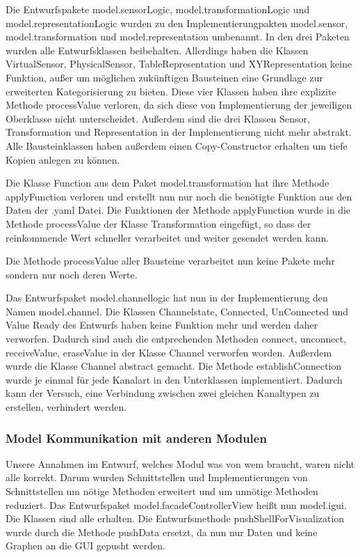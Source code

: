 \documentclass[parskip=full]{scrartcl}
\begin{document}
Die Entwurfspakete model.sensorLogic, model.transformationLogic und model.representationLogic wurden zu den Implementierungpakten model.sensor, model.transformation und model.representation umbenannt. In den drei Paketen wurden alle Entwurfsklassen beibehalten. Allerdings haben die Klassen VirtualSensor, PhysicalSensor, TableRepresentation und XYRepresentation keine Funktion, außer um möglichen zukünftigen Bausteinen eine Grundlage zur erweiterten Kategorisierung zu bieten. Diese vier Klassen haben ihre explizite Methode processValue verloren, da sich diese von Implementierung der jeweiligen Oberklasse nicht unterscheidet. Außerdem sind die drei Klassen Sensor, Transformation und Representation in der Implementierung nicht mehr abstrakt. Alle Bausteinklassen haben außerdem einen Copy-Constructor erhalten um tiefe Kopien anlegen zu können.

Die Klasse Function aus dem Paket model.transformation hat ihre Methode applyFunction verloren und erstellt nun nur noch die benötigte Funktion aus den Daten der .yaml Datei. Die Funktionen der Methode applyFunction wurde in die Methode processValue der Klasse Transformation eingefügt, so dass der reinkommende Wert schneller verarbeitet und weiter gesendet werden kann.

Die Methode processValue aller Bausteine verarbeitet nun keine Pakete mehr sondern nur noch deren Werte.

Das Entwurfspaket model.channellogic hat nun in der Implementierung den Namen model.channel. Die Klassen Channelstate, Connected, UnConnected und Value Ready des Entwurfs haben keine Funktion mehr und werden daher verworfen. Dadurch sind auch die entprechenden Methoden connect, unconnect, receiveValue, eraseValue in der Klasse Channel verworfen worden. Außerdem wurde die Klasse Channel abstract gemacht. Die Methode establishConnection wurde je einmal für jede Kanalart in den Unterklassen implementiert. Dadurch kann der Versuch, eine Verbindung zwischen zwei gleichen Kanaltypen zu erstellen, verhindert werden. 


\subsubsection{Model Kommunikation mit anderen Modulen}
Unsere Annahmen im Entwurf, welches Modul was von wem braucht, waren nicht alle korrekt. Darum wurden Schnittstellen und Implementierungen von Schnittstellen um nötige Methoden erweitert und um unnötige Methoden reduziert.
Das Entwurfspaket model.facadeControllerView heißt nun model.igui. Die Klassen sind alle erhalten. Die Entwurfsmethode pushShellForVisualization wurde durch die Methode pushData ersetzt, da nun nur Daten und keine Graphen an die GUI gepusht werden.
\end{document}
